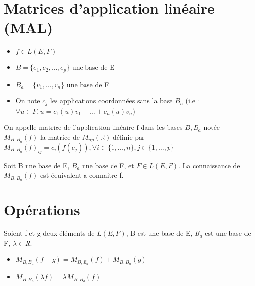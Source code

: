 \documentclass[french]{yLectureNote}
\newcommand{\R}[0]{\mathbb{R}}
\begin{document}
\section{Matrices d'application linéaire (MAL)}
\begin{definition}
\begin{itemize}
 \item \(f\in L(E,F)\)
 \item \(B = \{e_1,e_2,\dots,e_p\}\) une base de E
 \item \(B_a = \{v_1,\dots, v_n\}\) une base de F
 \item On note \(c_j\) les applications coordonnées sans la base \(B_a\) (i.e : \(\forall u\in F, u = c_1(u)v_1+\dots+c_n(u)v_n\))

\end{itemize}
On appelle matrice de l'application linéaire f dans les bases \(B, B_a\) notée \(M_{B,B_a}(f)\) la matrice de \(M_{np}(\R)\) définie par \(M_{B,B_a}(f)_{ij} = c_i(f(e_j)), \forall i \in \{1,\dots, n\}, j\in \{1,\dots, p\}\)
\end{definition}
%
%
%
%
%

\begin{proposition}
Soit B une base de E, \(B_a\) une base de F, et \(F\in L(E,F)\). La connaissance de \(M_{B,B_a}(f)\) est équivalent à connaitre f.
\end{proposition}
\section{Opérations}
\begin{proposition}
Soient f et g deux éléments de \(L(E,F)\), B est une base de E, \(B_a\) est une base de F, \(\lambda \in R\).

\begin{itemize}
 \item \(M_{B,B_a}(f+g) = M_{B,B_a}(f) +  M_{B,B_a}(g)\)
 \item \( M_{B,B_a}(\lambda f) = \lambda  M_{B,B_a}(f)\)
\end{itemize}
\end{proposition}
\end{document}
